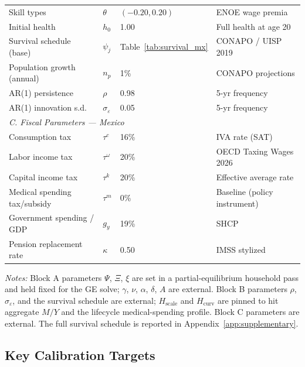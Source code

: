 \documentclass[12pt,a4paper]{article}
\begin{document}
\begin{table}[H]
\begin{tabular}{llll}
Skill types                   & $\theta$           & $(-0.20, 0.20)$ & ENOE wage premia \\
Initial health                & $h_{0}$            & 1.00       & Full health at age 20 \\
Survival schedule (base)      & $\psi_{j}$         & Table~\ref{tab:survival_mx} & CONAPO / UISP 2019 \\
Population growth (annual)    & $n_{p}$            & 1\%        & CONAPO projections \\
AR(1) persistence             & $\rho$             & 0.98       & 5-yr frequency \\
AR(1) innovation s.d.         & $\sigma_{\varepsilon}$ & 0.05   & 5-yr frequency \\
\hline
\multicolumn{4}{l}{\textit{C. Fiscal Parameters --- Mexico}} \\
Consumption tax               & $\tau^{c}$      & 16\% & IVA rate (SAT) \\
Labor income tax              & $\tau^{\omega}$ & 20\% & OECD Taxing Wages 2026 \\
Capital income tax            & $\tau^{k}$      & 20\% & Effective average rate \\
Medical spending tax/subsidy  & $\tau^{m}$      & 0\%  & Baseline (policy instrument) \\
Government spending / GDP     & $g_{y}$         & 19\% & SHCP \\
Pension replacement rate      & $\kappa$        & 0.50 & IMSS stylized \\
\hline\hline
\end{tabular}
\begin{minipage}{\linewidth}
\smallskip
\footnotesize
\textit{Notes:} Block A parameters $\Psi$, $\Xi$, $\xi$ are set in a
partial-equilibrium household pass and held fixed for the GE solve;
$\gamma$, $\nu$, $\alpha$, $\delta$, $A$ are external. Block B
parameters $\rho$, $\sigma_{\varepsilon}$, and the survival schedule
are external; $H_{\text{scale}}$ and $H_{\text{curv}}$ are pinned to
hit aggregate $M/Y$ and the lifecycle medical-spending profile.
Block C parameters are external. The full survival schedule is
reported in Appendix~\ref{app:supplementary}.
\end{minipage}
\end{table}

\subsection{Key Calibration Targets}
\label{subsec:targets}
\end{document}
